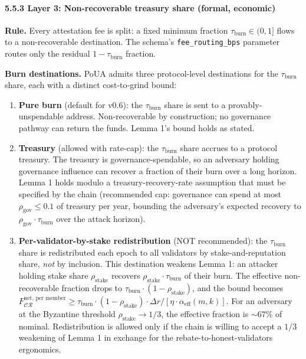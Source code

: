 \documentclass[
  11pt,
]{article}
\providecommand{\tightlist}{%
  \setlength{\itemsep}{0pt}\setlength{\parskip}{0pt}}
\begin{document}
\paragraph{5.5.3 Layer 3: Non-recoverable treasury share (formal,
economic)}\label{layer-3-non-recoverable-treasury-share-formal-economic}

\textbf{Rule.} Every attestation fee is split: a fixed minimum fraction
\(\tau_{\text{burn}} \in (0, 1]\) flows to a non-recoverable
destination. The schema's \texttt{fee\_routing\_bps} parameter routes
only the residual \(1 - \tau_{\text{burn}}\) fraction.

\textbf{Burn destinations.} PoUA admits three protocol-level
destinations for the \(\tau_{\text{burn}}\) share, each with a distinct
cost-to-grind bound:

\begin{enumerate}
\def\labelenumi{\arabic{enumi}.}
\tightlist
\item
  \textbf{Pure burn} (default for v0.6): the \(\tau_{\text{burn}}\)
  share is sent to a provably-unspendable address. Non-recoverable by
  construction; no governance pathway can return the funds. Lemma 1's
  bound holds as stated.
\item
  \textbf{Treasury} (allowed with rate-cap): the \(\tau_{\text{burn}}\)
  share accrues to a protocol treasury. The treasury is
  governance-spendable, so an adversary holding governance influence can
  recover a fraction of their burn over a long horizon. Lemma 1 holds
  modulo a treasury-recovery-rate assumption that must be specified by
  the chain (recommended cap: governance can spend at most
  \(\rho_{\text{gov}} \leq 0.1\) of treasury per year, bounding the
  adversary's expected recovery to
  \(\rho_{\text{gov}} \cdot \tau_{\text{burn}}\) over the attack
  horizon).
\item
  \textbf{Per-validator-by-stake redistribution} (NOT recommended): the
  \(\tau_{\text{burn}}\) share is redistributed each epoch to all
  validators by stake-and-reputation share, \emph{not} by inclusion.
  This destination weakens Lemma 1: an attacker holding stake share
  \(\rho_{\text{stake}}\) recovers
  \(\rho_{\text{stake}} \cdot \tau_{\text{burn}}\) of their burn. The
  effective non-recoverable fraction drops to
  \(\tau_{\text{burn}} \cdot (1 - \rho_{\text{stake}})\), and the bound
  becomes
  \(F_{\mathcal{CR}}^{\text{net, per member}} \geq \tau_{\text{burn}} \cdot (1 - \rho_{\text{stake}}) \cdot \Delta r / [\eta \cdot \alpha_{\text{eff}}(m, k)]\).
  For an adversary at the Byzantine threshold
  \(\rho_{\text{stake}} \to 1/3\), the effective fraction is
  \(\sim 67\%\) of nominal. Redistribution is allowed only if the chain
  is willing to accept a \(1/3\) weakening of Lemma 1 in exchange for
  the rebate-to-honest-validators ergonomics.
\end{enumerate}
\end{document}
